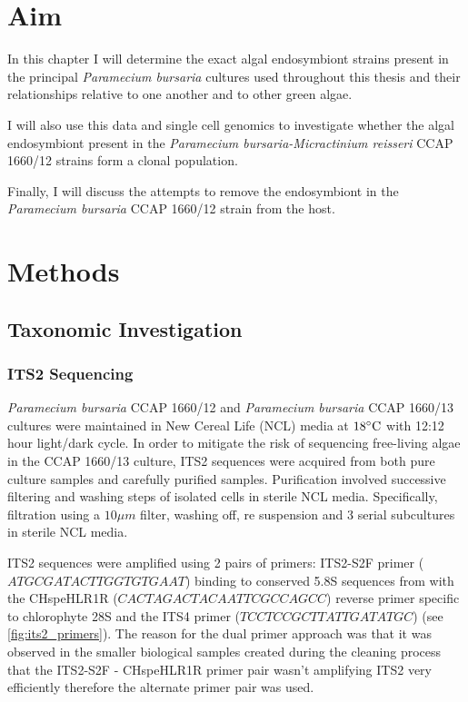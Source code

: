 \section{Aim}

In this chapter I will determine the exact algal endosymbiont strains present
in the principal \textit{Paramecium bursaria} cultures used throughout
this thesis and their relationships relative to one another and to
other green algae. 

I will also use this data and single cell genomics to investigate whether the algal
endosymbiont present in the \textit{Paramecium bursaria-Micractinium reisseri}
CCAP 1660/12 strains form a clonal population. 

Finally, I will discuss the attempts to remove the endosymbiont in the 
\textit{Paramecium bursaria} CCAP 1660/12 strain from the host.

\section{Methods}

\subsection{Taxonomic Investigation}
    
\subsubsection{ITS2 Sequencing}

\textit{Paramecium bursaria} CCAP 1660/12 and \textit{Paramecium bursaria} CCAP 
1660/13 cultures were maintained in New Cereal Life (NCL) media
at \(18\celsius\) with 12:12 hour light/dark cycle.  In order to mitigate
the risk of sequencing free-living algae in the CCAP 1660/13 culture, ITS2
sequences were acquired from both pure culture samples and carefully purified samples.
Purification involved successive filtering and washing steps of isolated cells in sterile NCL media. 
Specifically, filtration using a \(10\mu m\) filter, washing off, re suspension and 3 serial subcultures
in sterile NCL media. 

ITS2 sequences were amplified using 2 pairs of primers: ITS2-S2F primer (\(ATGCGATACTTGGTGTGAAT\))
binding to conserved 5.8S sequences from \citep{Chen2010} with the CHspeHLR1R (\(CACTAGACTACAATTCGCCAGCC\))
reverse primer specific to chlorophyte 28S \citep{Hoshina2004} and the ITS4 primer (\(TCCTCCGCTTATTGATATGC\))
\citep{white1990amplification} (see \cref{fig:its2_primers}).  The reason for the dual primer
approach was that it was observed in the smaller biological samples created during the cleaning
process that the ITS2-S2F - CHspeHLR1R primer pair wasn't amplifying ITS2 very efficiently
therefore the alternate primer pair was used. 

